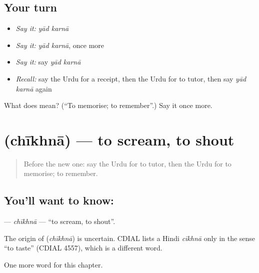 \subsection*{Your turn}
\begin{itemize}
\raggedright
  \item \emph{Say it:} \emph{yād karnā}
  \item \emph{Say it:} \emph{yād karnā}, once more
  \item \emph{Say it:} say \emph{yād karnā}
  \item \emph{Recall:} say the Urdu for a receipt, then the Urdu for to tutor, then say \emph{yād karnā} again
\end{itemize}

\begin{tcolorbox}[breakable,colback=teal!4,colframe=teal!35!black,title={Before you move on}]
What does   mean? (\textquotedblleft{}To memorise; to remember\textquotedblright{}.) Say it once more.
\end{tcolorbox}
\section[\texorpdfstring{\ur{چیخنا} (chīkhnā)}{چیخنا (chīkhnā)}]{ (chīkhnā) — to scream, to shout}

\label{lesson:UR-C147-chikhna}



\begin{quote}
Before the new one: say the Urdu for to tutor, then the Urdu for to memorise; to remember.
\end{quote}

\subsection*{You'll want to know: }
\textbf{} — \emph{chīkhnā} — \textquotedblleft{}to scream, to shout\textquotedblright{}.

\begin{cousinweb}
The origin of \textbf{} (\emph{chīkhnā}) is uncertain. CDIAL lists a Hindi \emph{cīkhnā} only in the sense \textquotedblleft{}to taste\textquotedblright{} (CDIAL 4557), which is a different word.
\end{cousinweb}

\begin{grammarlens}[title={What you've built}]
One more word for this chapter.
\end{grammarlens}

